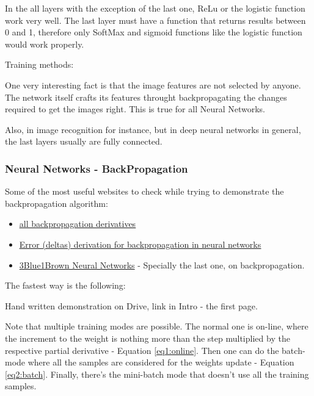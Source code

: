 

In the all layers with the exception of the last one, ReLu or the logistic function work very well. The last layer must have a function that returns results between 0 and 1, therefore only SoftMax and sigmoid functions like the logistic function would work properly.





Training methods:



One very interesting fact is that the image features are not selected by anyone. The network itself crafts its features throught backpropagating the changes required to get the images right. This is true for all Neural Networks.

Also, in image recognition for instance, but in deep neural networks in general, the last layers usually are fully connected.

\subsubsection{Neural Networks - BackPropagation}

Some of the most useful websites to check while trying to demonstrate the backpropagation algorithm:
\begin{itemize}
    \item \href{https://medium.com/@pdquant/all-the-backpropagation-derivatives-d5275f727f60}{\ul{all backpropagation derivatives}}
    \item \href{https://stats.stackexchange.com/questions/94387/how-to-derive-errors-in-neural-network-with-the-backpropagation-algorithm}{\ul{Error (deltas) derivation for backpropagation in neural networks}}
    \item \href{https://www.youtube.com/playlist?list=PLZHQObOWTQDNU6R1_67000Dx_ZCJB-3pi}{3Blue1Brown Neural Networks} - Specially the last one, on backpropagation.
\end{itemize}

The fastest way is the following:

Hand written demonstration on Drive, link in Intro - the first page.

\vspace{1cm}

Note that multiple training modes are possible. The normal one is on-line, where the increment to the weight is nothing more than the step multiplied by the respective partial derivative - Equation \eqref{eq1:online}. Then one can do the batch-mode where all the samples are considered for the weights update - Equation \eqref{eq2:batch}. Finally, there's the mini-batch mode that doesn't use all the training samples.

